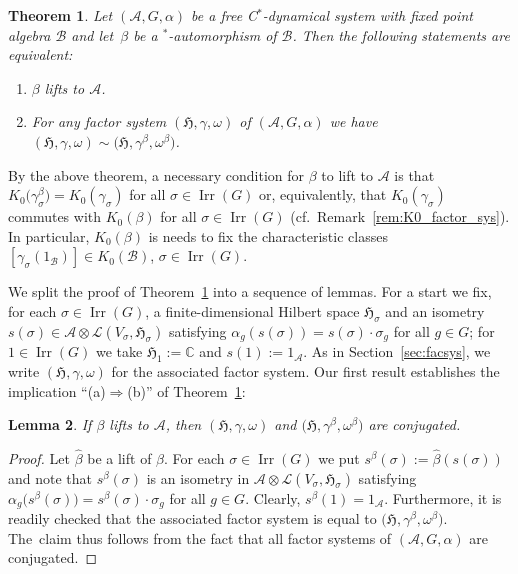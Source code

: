 \documentclass[11pt]{article}
\numberwithin{equation}{section}
\numberwithin{equation}{section}
\newtheorem{Theorem}{Theorem}[section]
\newtheorem{Lemma}[Theorem]{Lemma}
\newcommand*{\C}{\mathbb C}		%
\newcommand*{\tensor}{\otimes}		%
\newcommand*{\Star}{$^*$\nobreakdash}
\newcommand*{\hilb}{\mathfrak}		%
\newcommand*{\alg}{\mathcal}		%
\newcommand*{\hH}{\hilb{H}}			%
\newcommand*{\one}{1}				%
\newcommand*{\aA}{\alg{A}}			%
\newcommand*{\aB}{\alg{B}} 			%
\newcommand*{\End}{\mathcal{L}} %
\DeclareMathOperator{\Irrep}{Irr} 			%
\begin{document}
\begin{Theorem}\label{thm:lift_conjugated_factor_sys}
	Let $(\aA, G, \alpha)$ be a free C\Star-dynamical system with fixed point algebra $\aB$ and let~$\beta$ be a \Star-automorphism of $\aB$.
	Then the following statements are equivalent:
	\begin{enumerate}\itemsep=0pt
	\item[$(a)$] $\beta$ lifts to $\aA$.
	\item[$(b)$] For any factor system $(\hH, \gamma, \omega)$ of $(\aA, G, \alpha)$ we have $(\hH, \gamma, \omega) \sim \big(\hH, \gamma^\beta, \omega^\beta\big)$.
	\end{enumerate}
\end{Theorem}
\begin{Remark}
	By the above theorem, a necessary condition for $\beta$ to lift to $\aA$ is that $K_0\big(\gamma_\sigma^\beta\big) = K_0(\gamma_\sigma)$ for all $\sigma \in \Irrep(G)$ or, equivalently, that $K_0(\gamma_\sigma)$ commutes with $K_0(\beta)$ for all $\sigma \in \Irrep(G)$ (cf.~Remark~\ref{rem:K0_factor_sys}).
	In particular, $K_0(\beta)$ is needs to fix the characteristic classes $[\gamma_\sigma(\one_\aB)] \in K_0(\aB)$, $\sigma \in \Irrep(G)$.
\end{Remark}

We split the proof of Theorem~\ref{thm:lift_conjugated_factor_sys} into a sequence of lemmas.
For a start we fix, for each $\sigma \in \Irrep(G)$, a finite-dimensional Hilbert space $\hH_\sigma$ and an isometry $s(\sigma)\in \aA \tensor \End(V_\sigma,\hH_\sigma)$ satisfying $\alpha_g (s(\sigma) )=s(\sigma) \cdot \sigma_g$ for all $g \in G$; for $1 \in \Irrep(G)$ we take $\hH_1 := \C$ and $s(1) := \one_\aA$.
As in Section~\ref{sec:facsys}, we write $(\hH, \gamma, \omega)$ for the associated factor system.
Our first result establishes the implication ``(a)$\Rightarrow$(b)'' of Theorem~\ref{thm:lift_conjugated_factor_sys}:

\begin{Lemma}\label{lem:conjugated}
	If $\beta$ lifts to $\aA$, then $(\hH, \gamma, \omega)$ and $\big(\hH, \gamma^\beta, \omega^\beta\big)$ are conjugated.
\end{Lemma}
\begin{proof}
	Let $\hat \beta$ be a lift of $\beta$.
	For each $\sigma \in \Irrep(G)$ we put $s^\beta(\sigma) := \hat \beta ( s(\sigma) )$ and note that $s^\beta(\sigma)$ is an isometry in $\aA \tensor \End(V_\sigma,\hH_\sigma)$ satisfying $\alpha_g\big(s^\beta(\sigma)\big)=s^\beta(\sigma) \cdot \sigma_g$ for all $g \in G$.
	Clearly, $s^\beta(1) = \one_\aA$.
	Furthermore, it is readily checked that the associated factor system is equal to $\big(\hH, \gamma^\beta, \omega^\beta\big)$.
	The~claim thus follows from the fact that all factor systems of $(\aA, G, \alpha)$ are conjugated.
\end{proof}
\end{document}
